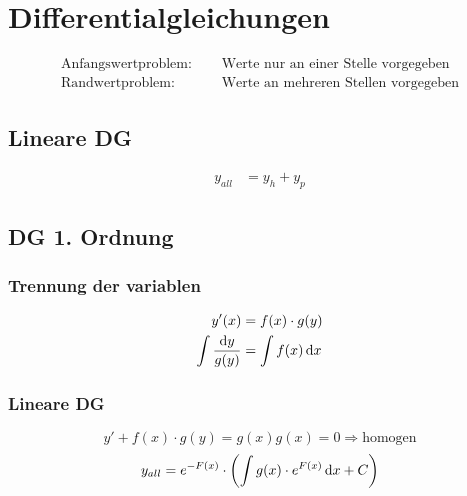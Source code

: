 \newpage
\section{Differentialgleichungen}

\begin{align*}
\text{Anfangswertproblem:}\quad&\text{ Werte nur an einer Stelle vorgegeben}\\
\text{Randwertproblem:}\quad&\text{ Werte an mehreren Stellen vorgegeben}
\end{align*}


\subsection*{Lineare DG}
\begin{align*}
y_{all}&=y_h+y_p
\end{align*}

\subsection{DG 1. Ordnung}
\begin{multicols}{2}
\subsubsection*{Trennung der variablen}
\begin{align*}
y'(x)&=f(x)\cdot g(y)\\
\int\frac{\mathop{}\!\mathrm{d} y}{g(y)}&=\int f(x)\mathop{}\!\mathrm{d} x
\end{align*}
\vfill
\subsubsection*{Lineare DG}
\[y'+f(x)\cdot g(y)=g(x) \text{$g(x)=0\Rightarrow$homogen}\]
\[y_{all}=e^{-F(x)}\cdot\left(\int g(x)\cdot e^{F(x)}\mathop{}\!\mathrm{d} x+C\right)\]
\vfill
\end{multicols}

